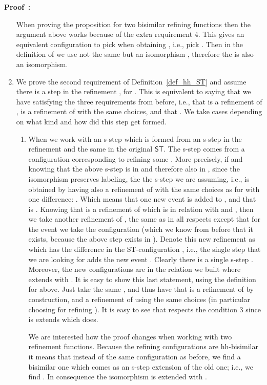 \documentclass[submission,copyright,creativecommons]{eptcs}
\newenvironment{proof}[1][\!\!\,]{\vspace{1ex}\noindent\textbf{Proof #1: }}{\hfill\vspace{2ex}}
\newcounter{case}
\newcommand\ST{\ensuremath{\mathsf{ST}}}
\begin{document}
\begin{proof}
\begin{enumerate}
When proving the proposition for two bisimilar refining functions then the argument above works because of the extra requirement 4. This gives an equivalent configuration to pick when obtaining , i.e., pick . Then in the definition of  we use not the same  but an isomorphism , therefore the  is also an isomorphism.

\item We prove the second requirement of Definition~\ref{def_hh_ST} and assume there is a step  in the refinement , for . This is equivalent to saying that we have  satisfying the three requirements from before, i.e., that  is a refinement of ,  is a refinement of  with the same choices, and that .
We take cases depending on what kind and how did this step get formed.
\begin{enumerate}
\item When we work with an s-step which is formed from an s-step in the refinement and the same  in the original \ST.
The s-step comes from a configuration  corresponding to refining some . More precisely, if  and knowing that the above s-step is in  and therefore also in , since the isomorphism  preserves labeling, the the s-step we are assuming, i.e.,  is obtained by having  also a refinement of  with the same choices as for  with one difference: . Which means that one new event is added to , and that is .
Knowing that  is a refinement of  which is in relation  with  and , then we take another refinement of , the same as  in all respects except that for the event  we take the configuration  (which we know from before that it exists, because the above step exists in ). Denote this new refinement as  which has the difference in the ST-configuration , i.e., the single step that we are looking for adds the new event . Clearly there is a single s-step . Moreover, the new configurations are in the relation we built  where  extends  with .
It is easy to show this last statement, using the definition for  above. Just take the same , and thus have that  is a refinement of  by construction, and  a refinement of  using the same choices (in particular choosing  for refining ). It is easy to see that  respects the condition 3 since is extends  which does.

\vspace{1ex}We are interested how the proof changes when working with two refinement functions. Because the refining configurations are hh-bisimilar it means that instead of the same configuration as before, we find a bisimilar one which comes as an s-step extension of the old one; i.e., we find . In consequence the isomorphism is extended with .


\end{enumerate}
\end{enumerate}
\end{proof}
\end{document}
